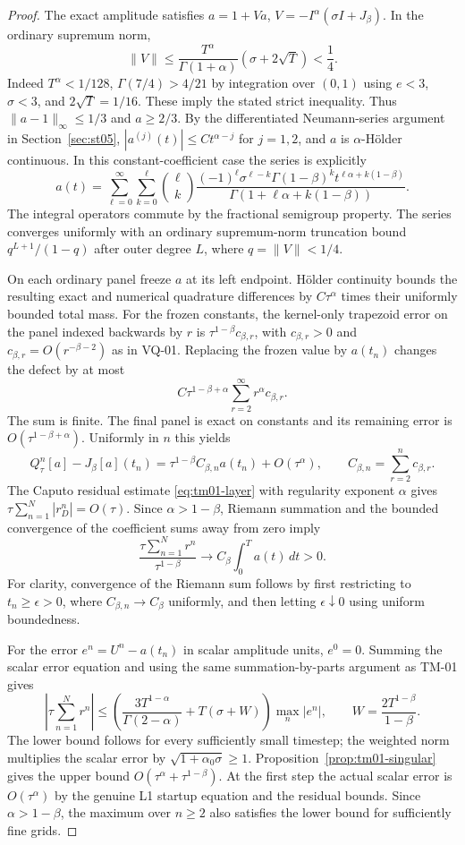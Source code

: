 \begin{proof}
The exact amplitude satisfies $a=1+Va$, $V=-I^\alpha(\sigma I+J_\beta)$. In the ordinary supremum norm,
\[
 \|V\|\le \frac{T^\alpha}{\Gamma(1+\alpha)}(\sigma+2\sqrt T)<\frac14.
\]
Indeed $T^\alpha<1/128$, $\Gamma(7/4)>4/21$ by integration over $(0,1)$ using $e<3$, $\sigma<3$, and $2\sqrt T=1/16$. These imply the stated strict inequality. Thus $\|a-1\|_\infty\le1/3$ and $a\ge2/3$. By the differentiated Neumann-series argument in Section~\ref{sec:st05}, $|a^{(j)}(t)|\le Ct^{\alpha-j}$ for $j=1,2$, and $a$ is $\alpha$-H\"older continuous. In this constant-coefficient case the series is explicitly
\[
 a(t)=\sum_{\ell=0}^\infty\sum_{k=0}^{\ell}
 \binom{\ell}{k}\frac{(-1)^\ell\sigma^{\ell-k}\Gamma(1-\beta)^k
 t^{\ell\alpha+k(1-\beta)}}{\Gamma(1+\ell\alpha+k(1-\beta))}.
\]
The integral operators commute by the fractional semigroup property. The series converges uniformly with an ordinary supremum-norm truncation bound $q^{L+1}/(1-q)$ after outer degree $L$, where $q=\|V\|<1/4$.

On each ordinary panel freeze $a$ at its left endpoint. H\"older continuity bounds the resulting exact and numerical quadrature differences by $C\tau^\alpha$ times their uniformly bounded total mass. For the frozen constants, the kernel-only trapezoid error on the panel indexed backwards by $r$ is $\tau^{1-\beta}c_{\beta,r}$, with $c_{\beta,r}>0$ and $c_{\beta,r}=O(r^{-\beta-2})$ as in VQ-01. Replacing the frozen value by $a(t_n)$ changes the defect by at most
\[
 C\tau^{1-\beta+\alpha}\sum_{r=2}^{\infty}r^\alpha c_{\beta,r}.
\]
The sum is finite. The final panel is exact on constants and its remaining error is $O(\tau^{1-\beta+\alpha})$. Uniformly in $n$ this yields
\[
 Q_\tau^n[a]-J_\beta[a](t_n)
 =\tau^{1-\beta}C_{\beta,n}a(t_n)+O(\tau^\alpha),
 \qquad C_{\beta,n}=\sum_{r=2}^{n}c_{\beta,r}.
\]
The Caputo residual estimate \eqref{eq:tm01-layer} with regularity exponent $\alpha$ gives $\tau\sum_{n=1}^N|r_D^n|=O(\tau)$. Since $\alpha>1-\beta$, Riemann summation and the bounded convergence of the coefficient sums away from zero imply
\[
 \frac{\tau\sum_{n=1}^N r^n}{\tau^{1-\beta}}
 \longrightarrow C_\beta\int_0^T a(t)\,dt>0.
\]
For clarity, convergence of the Riemann sum follows by first restricting to $t_n\ge\epsilon>0$, where $C_{\beta,n}\to C_\beta$ uniformly, and then letting $\epsilon\downarrow0$ using uniform boundedness.

For the error $e^n=U^n-a(t_n)$ in scalar amplitude units, $e^0=0$. Summing the scalar error equation and using the same summation-by-parts argument as TM-01 gives
\[
 \left|\tau\sum_{n=1}^N r^n\right|\le
 \left(\frac{3T^{1-\alpha}}{\Gamma(2-\alpha)}+T(\sigma+W)\right)
 \max_n|e^n|,
 \qquad W=\frac{2T^{1-\beta}}{1-\beta}.
\]
The lower bound follows for every sufficiently small timestep; the weighted norm multiplies the scalar error by $\sqrt{1+\alpha_0\sigma}\ge1$. Proposition~\ref{prop:tm01-singular} gives the upper bound $O(\tau^\alpha+\tau^{1-\beta})$. At the first step the actual scalar error is $O(\tau^\alpha)$ by the genuine L1 startup equation and the residual bounds. Since $\alpha>1-\beta$, the maximum over $n\ge2$ also satisfies the lower bound for sufficiently fine grids.
\end{proof}

